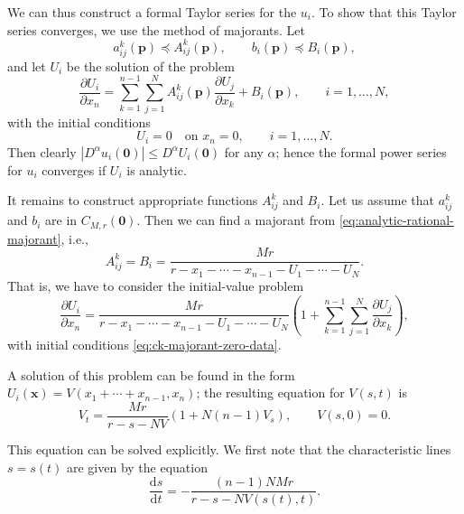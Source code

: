 \begin{Proof}
We can thus construct a formal Taylor series for the $u_i$. To show that this Taylor series converges, we use the method of majorants. Let
\begin{equation}\label{eq:ck-coefficient-majorants}
a_{ij}^k(\bm{p})\preceq A_{ij}^k(\bm{p}),\qquad b_i(\bm{p})\preceq B_i(\bm{p}),
\end{equation}
and let $U_i$ be the solution of the problem
\begin{equation}\label{eq:ck-majorant-system}
\dfrac{\partial U_i}{\partial x_n}=\sum_{k=1}^{n-1}\sum_{j=1}^NA_{ij}^k(\bm{p})\dfrac{\partial U_j}{\partial x_k}+B_i(\bm{p}),\qquad i=1,\ldots,N,
\end{equation}
with the initial conditions
\begin{equation}\label{eq:ck-majorant-zero-data}
U_i=0\quad\text{on }x_n=0,\qquad i=1,\ldots,N.
\end{equation}
Then clearly $|D^\alpha u_i(\bm{0})|\leq D^\alpha U_i(\bm{0})$ for any $\alpha$; hence the formal power series for $u_i$ converges if $U_i$ is analytic.

It remains to construct appropriate functions $A_{ij}^k$ and $B_i$. Let us assume that $a_{ij}^k$ and $b_i$ are in $C_{M,r}(\bm{0})$. Then we can find a majorant from \eqref{eq:analytic-rational-majorant}, i.e.,
\begin{equation}\label{eq:ck-rational-coefficient-majorants}
A_{ij}^k=B_i=\dfrac{Mr}{r-x_1-\cdots-x_{n-1}-U_1-\cdots-U_N}.
\end{equation}
That is, we have to consider the initial-value problem
\begin{equation}\label{eq:ck-rational-majorant-system}
\dfrac{\partial U_i}{\partial x_n}=\dfrac{Mr}{r-x_1-\cdots-x_{n-1}-U_1-\cdots-U_N}\left(1+\sum_{k=1}^{n-1}\sum_{j=1}^N\dfrac{\partial U_j}{\partial x_k}\right),
\end{equation}
with initial conditions \eqref{eq:ck-majorant-zero-data}.

A solution of this problem can be found in the form $U_i(\bm{x})=V(x_1+\cdots+x_{n-1},x_n)$; the resulting equation for $V(s,t)$ is
\begin{equation}\label{eq:ck-scalar-majorant-problem}
V_t=\dfrac{Mr}{r-s-NV}(1+N(n-1)V_s),\qquad V(s,0)=0.
\end{equation}


This equation can be solved explicitly. We first note that the characteristic lines $s=s(t)$ are given by the equation
\begin{equation}\label{eq:ck-majorant-characteristics}
\dfrac{\mathrm{d}s}{\mathrm{d}t}=-\dfrac{(n-1)NMr}{r-s-NV(s(t),t)}.
\end{equation}



\end{Proof}
